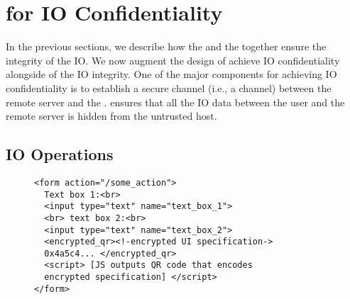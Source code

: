\iffalse
\begin{figure}[h]
\centering
\texttt{[image: inputPrivacy.pdf]}
\caption{Input Confidentiality}
\label{fig:inputPrivacy}
\centering
\end{figure}
\fi



\section{\name for IO Confidentiality}
\label{sec:confidentiality}


In the previous sections, we describe how the \name \js and the \device together ensure the integrity of the IO. We now augment the design of \name achieve IO confidentiality alongside of the IO integrity. One of the major components for achieving IO confidentiality is to establish a secure channel (i.e., a \tls channel) between the remote server and the \device. \tls ensures that all the IO data between the user and the remote server is hidden from the untrusted host.  


\subsection{IO Operations}
\label{sec:confidentiality:io}

\begin{figure}[t]
\small
\begin{lstlisting}[mathescape=true]
<form action="/some_action">
  Text box 1:<br>
  <input type="text" name="text_box_1">
  <br> text box 2:<br>
  <input type="text" name="text_box_2">
  <encrypted_qr><!-encrypted UI specification->
  0x4a5c4... </encrypted_qr>
  <script> [JS outputs QR code that encodes 
  encrypted specification] </script>
</form> 
\end{lstlisting} 
\end{figure}




